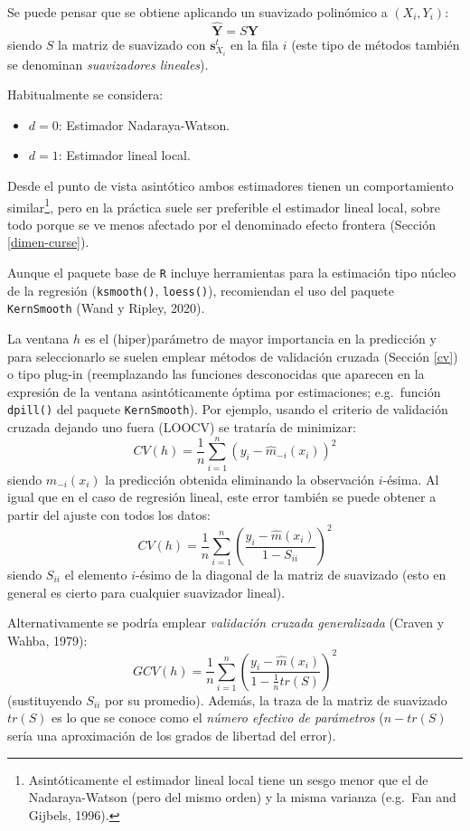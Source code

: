 \documentclass[
]{book}
\theoremstyle{break}
\theoremstyle{definition}
\theoremstyle{definition}
\theoremstyle{definition}
\theoremstyle{remark}
\begin{document}
Se puede pensar que se obtiene aplicando un suavizado polinómico a
\((X_i, Y_i)\):
\[\hat{\mathbf{Y}} = S\mathbf{Y}\]
siendo \(S\) la matriz de suavizado con \(\mathbf{s}_{X_{i}}^{t}\) en la fila \(i\) (este tipo de métodos también se denominan \emph{suavizadores lineales}).

Habitualmente se considera:

\begin{itemize}
\item
  \(d=0\): Estimador Nadaraya-Watson.
\item
  \(d=1\): Estimador lineal local.
\end{itemize}

Desde el punto de vista asintótico ambos estimadores tienen un comportamiento similar\footnote{Asintóticamente el estimador lineal local tiene un sesgo menor que el de Nadaraya-Watson (pero del mismo orden) y la misma varianza (e.g.~Fan and Gijbels, 1996).}, pero en la práctica suele ser preferible el estimador lineal local, sobre todo porque se ve menos afectado por el denominado efecto frontera (Sección \ref{dimen-curse}).

Aunque el paquete base de \texttt{R} incluye herramientas para la estimación tipo núcleo de la regresión (\texttt{ksmooth()}, \texttt{loess()}), recomiendan el uso del paquete \texttt{KernSmooth} (Wand y Ripley, 2020).

La ventana \(h\) es el (hiper)parámetro de mayor importancia en la predicción y para seleccionarlo se suelen emplear métodos de validación cruzada (Sección \ref{cv}) o tipo plug-in (reemplazando las funciones desconocidas que aparecen en la expresión de la ventana asintóticamente óptima por estimaciones; e.g.~función \texttt{dpill()} del paquete \texttt{KernSmooth}).
Por ejemplo, usando el criterio de validación cruzada dejando uno fuera (LOOCV) se trataría de minimizar:
\[CV(h)=\frac{1}{n}\sum_{i=1}^n(y_i-\hat{m}_{-i}(x_i))^2\]
siendo \(\hat{m}_{-i}(x_i)\) la predicción obtenida eliminando la observación \(i\)-ésima.
Al igual que en el caso de regresión lineal, este error también se puede obtener a partir del ajuste con todos los datos:
\[CV(h)=\frac{1}{n}\sum_{i=1}^n\left(\frac{y_i-\hat{m}(x_i)}{1 - S_{ii}}\right)^2\]
siendo \(S_{ii}\) el elemento \(i\)-ésimo de la diagonal de la matriz de suavizado (esto en general es cierto para cualquier suavizador lineal).

Alternativamente se podría emplear \emph{validación cruzada generalizada} (Craven y Wahba, 1979):
\[GCV(h)=\frac{1}{n}\sum_{i=1}^n\left(\frac{y_i-\hat{m}(x_i)}{1 - \frac{1}{n}tr(S)}\right)^2\]
(sustituyendo \(S_{ii}\) por su promedio).
Además, la traza de la matriz de suavizado \(tr(S)\) es lo que se conoce como el \emph{número efectivo de parámetros} (\(n - tr(S)\) sería una aproximación de los grados de libertad del error).
\end{document}
